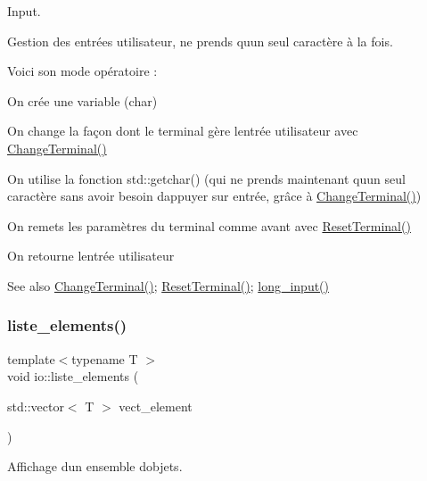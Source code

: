Input. 

Gestion des entrées utilisateur, ne prends qu\textquotesingle{}un seul caractère à la fois.

Voici son mode opératoire \+:
\begin{DoxyEnumerate}
\item On crée une variable (char)
\item On change la façon dont le terminal gère l\textquotesingle{}entrée utilisateur avec \hyperlink{namespaceio_ac0223d0ecfee82d8cc86543604173b73}{Change\+Terminal()}
\item On utilise la fonction std\+::getchar() (qui ne prends maintenant qu\textquotesingle{}un seul caractère sans avoir besoin d\textquotesingle{}appuyer sur entrée, grâce à \hyperlink{namespaceio_ac0223d0ecfee82d8cc86543604173b73}{Change\+Terminal()})
\item On remets les paramètres du terminal comme avant avec \hyperlink{namespaceio_a44a79937063c75bdcd8f042d5f55d501}{Reset\+Terminal()}
\item On retourne l\textquotesingle{}entrée utilisateur \begin{DoxySeeAlso}{See also}
\hyperlink{namespaceio_ac0223d0ecfee82d8cc86543604173b73}{Change\+Terminal()}; \hyperlink{namespaceio_a44a79937063c75bdcd8f042d5f55d501}{Reset\+Terminal()}; \hyperlink{namespaceio_ab044be3afd7ac04eeb1a496af0f1d5c6}{long\+\_\+input()} 
\end{DoxySeeAlso}

\end{DoxyEnumerate}\mbox{\label{namespaceio_acf5693654c155fd094993bf20ac39343}} 
\subsubsection{\texorpdfstring{liste\+\_\+elements()}{liste\_elements()}}
{\footnotesize\ttfamily template$<$typename T $>$ \\
void io\+::liste\+\_\+elements (\begin{DoxyParamCaption}\item[{std\+::vector$<$ T $>$}]{vect\+\_\+element }\end{DoxyParamCaption})}



Affichage d\textquotesingle{}un ensemble d\textquotesingle{}objets. 

